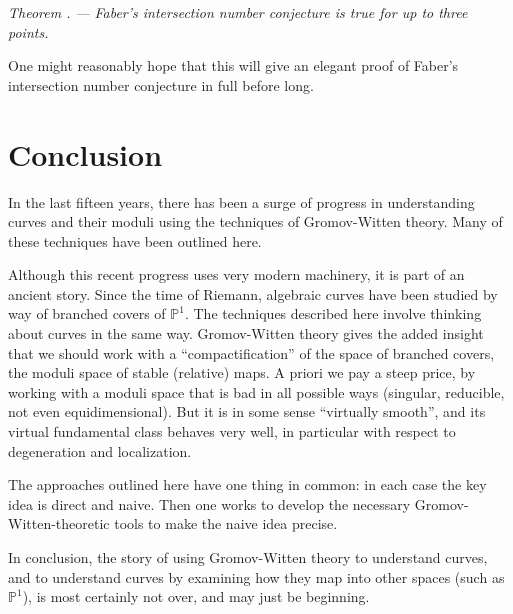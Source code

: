 \documentclass[12pt,letterpaper]{amsart}
\newcommand{\tpoint}[1]{\vspace{3mm}\par \noindent \refstepcounter{subsection}{\bf \thesubsection.} 
  {\em #1. ---} }
\newcommand{\proj}{\mathbb P}
\begin{document}
{\tpoint{Theorem \cite{gjv}} {\em Faber's intersection number
  conjecture is true for up to three points.}

One might reasonably hope that this will give an elegant proof of
Faber's intersection number conjecture in full before long.

\section{Conclusion}

In the last fifteen years, there has been a surge of progress in
understanding curves and their moduli using the techniques of
Gromov-Witten theory.  Many of these techniques have been outlined
here.

Although this recent progress uses very modern machinery, it is part
of an ancient story.  Since the time of Riemann, algebraic curves have
been studied by way of branched covers of $\proj^1$.  The techniques
described here involve thinking about curves in the same way.
Gromov-Witten theory gives the added insight that we should work with
a ``compactification'' of the space of branched covers, the moduli
space of stable (relative) maps.  A priori we pay a steep price, by
working with a moduli space that is bad in all possible ways
(singular, reducible, not even equidimensional).  But it is in some
sense ``virtually smooth'', and its virtual fundamental class behaves
very well, in particular with respect to degeneration and localization.

The approaches outlined here have one thing in common:  in each case the key 
idea is direct and naive.  Then one works to develop the necessary
Gromov-Witten-theoretic tools to make the naive idea precise.

In conclusion, the story of using Gromov-Witten theory to understand
curves, and to understand curves by examining how they map into other
spaces (such as $\proj^1$), is most certainly not over, and may just
be beginning.


  

} %
\end{document}
